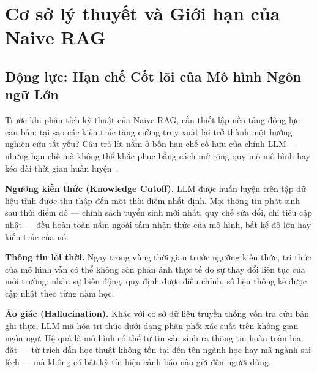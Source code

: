 \documentclass[12pt,a4paper]{report}
\theoremstyle{plain}
\theoremstyle{definition}
\begin{document}
	\clearpage
	
	
	\newcommand{\mainmatter}{\pagenumbering{arabic}}
	
	
	\chapter{Cơ sở lý thuyết và Giới hạn của Naive RAG}
	\label{chap:naive_rag}
	
	\section{Động lực: Hạn chế Cốt lõi của Mô hình Ngôn ngữ Lớn}
	\label{sec:llm_limitations}
	
	Trước khi phân tích kỹ thuật của Naive RAG, cần thiết lập nền tảng động lực
	căn bản: tại sao các kiến trúc tăng cường truy xuất lại trở thành một hướng
	nghiên cứu tất yếu? Câu trả lời nằm ở bốn hạn chế cố hữu của chính LLM ---
	những hạn chế mà không thể khắc phục bằng cách mở rộng quy mô mô hình hay
	kéo dài thời gian huấn luyện~\cite{neo4j2024essential}.
	
	\textbf{Ngưỡng kiến thức (Knowledge Cutoff).} LLM được huấn luyện trên tập
	dữ liệu tĩnh được thu thập đến một thời điểm nhất định. Mọi thông tin phát
	sinh sau thời điểm đó --- chính sách tuyển sinh mới nhất, quy chế sửa đổi,
	chỉ tiêu cập nhật --- đều hoàn toàn nằm ngoài tầm nhận thức của mô hình, bất
	kể độ lớn hay kiến trúc của nó.
	
	\textbf{Thông tin lỗi thời.} Ngay trong vùng thời gian trước ngưỡng kiến thức,
	tri thức của mô hình vẫn có thể không còn phản ánh thực tế do sự thay đổi liên
	tục của môi trường: nhân sự biến động, quy định được điều chỉnh, số liệu thống
	kê được cập nhật theo từng năm học.
	
	\textbf{Ảo giác (Hallucination).} Khác với cơ sở dữ liệu truyền thống vốn tra
	cứu bản ghi thực, LLM mã hóa tri thức dưới dạng phân phối xác suất trên không
	gian ngôn ngữ. Hệ quả là mô hình có thể tự tin sản sinh ra thông tin hoàn toàn
	bịa đặt --- từ trích dẫn học thuật không tồn tại đến tên ngành học hay mã ngành
	sai lệch --- mà không có bất kỳ tín hiệu cảnh báo nào gửi đến người dùng.
	
\end{document}

